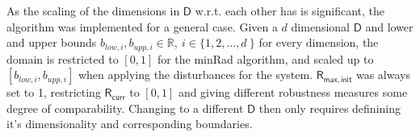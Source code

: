     As the scaling of the dimensions in $\mathsf{D}$ w.r.t. each other has is significant, the algorithm was implemented for a general case. Given a $d$ dimensional $\mathsf{D}$ and lower and upper bounds $b_{low,i}, b_{upp,i} \in \mathbb{R},\ i \in \{1,2,\ldots,d\ \}$ for every dimension, the domain is restricted to $[0,1]$ for the minRad algorithm, and scaled up to $[b_{low,i}, b_{upp,i}]$ when applying the disturbances for the system. $\mathsf{R_{max,init}}$ was always set to 1, restricting $\mathsf{R_{curr}}$ to $[0,1]$ and giving different robustness measures some degree of comparability. 
    Changing to a different $\mathsf{D}$ then only requires definining it's dimensionality and corresponding boundaries.



    



